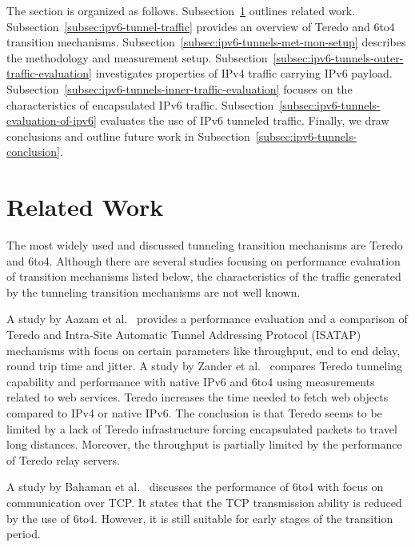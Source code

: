 
The section is organized as follows. Subsection~\ref{subsec:ipv6-tunnels-related-work} outlines related work. Subsection~\ref{subsec:ipv6-tunnel-traffic} provides an overview of Teredo and 6to4 transition mechanisms. Subsection~\ref{subsec:ipv6-tunnels-met-mon-setup} describes the methodology and measurement setup. Subsection~\ref{subsec:ipv6-tunnels-outer-traffic-evaluation} investigates properties of IPv4 traffic carrying IPv6 payload. Subsection~\ref{subsec:ipv6-tunnels-inner-traffic-evaluation} focuses on the characteristics of encapsulated IPv6 traffic. Subsection~\ref{subsec:ipv6-tunnels-evaluation-of-ipv6} evaluates the use of IPv6 tunneled traffic. Finally, we draw conclusions and outline future work in Subsection~\ref{subsec:ipv6-tunnels-conclusion}.

\section{Related Work} \label{subsec:ipv6-tunnels-related-work}

The most widely used and discussed tunneling transition mechanisms are Teredo and 6to4. Although there are several studies focusing on performance evaluation of transition mechanisms listed below, the characteristics of the traffic generated by the tunneling transition mechanisms are not well known.

A study by Aazam et al.~\cite{aazam} provides a performance evaluation and a comparison of Teredo and Intra-Site Automatic Tunnel Addressing Protocol (ISATAP) mechanisms with focus on certain parameters like throughput, end to end delay, round trip time and jitter. A study by Zander et al.~\cite{zander} compares Teredo tunneling capability and performance with native IPv6 and 6to4 using measurements related to web services. Teredo increases the time needed to fetch web objects compared to IPv4 or native IPv6. The conclusion is that Teredo seems to be limited by a lack of Teredo infrastructure forcing encapsulated packets to travel long distances. Moreover, the throughput is partially limited by the performance of Teredo relay servers.

A study by Bahaman et al.~\cite{bahaman} discusses the performance of 6to4 with focus on communication over TCP. It states that the TCP transmission ability is reduced by the use of 6to4. However, it is still suitable for early stages of the transition period.

